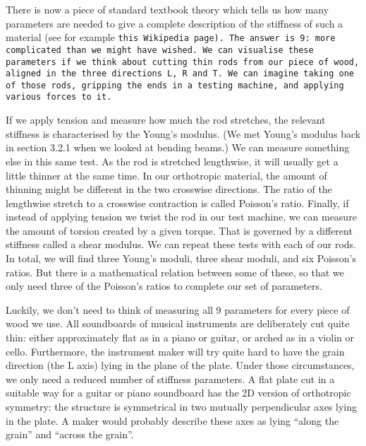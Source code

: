
  There is now a piece of standard textbook theory which tells us how many 
  parameters are needed to give a complete description of the stiffness of such 
  a material (see for example \tt{}this Wikipedia page\rm{}). The answer is 9: more 
  complicated than we might have wished. We can visualise these parameters if 
  we think about cutting thin rods from our piece of wood, aligned in the three 
  directions L, R and T. We can imagine taking one of those rods, gripping the 
  ends in a testing machine, and applying various forces to it. 

  If we apply tension and measure how much the rod stretches, the relevant 
  stiffness is characterised by the Young’s modulus. (We met Young’s modulus 
  back in section 3.2.1 when we looked at bending beams.) We can measure 
  something else in this same test. As the rod is stretched lengthwise, it will 
  usually get a little thinner at the same time. In our orthotropic material, 
  the amount of thinning might be different in the two crosswise directions. 
  The ratio of the lengthwise stretch to a crosswise contraction is called 
  Poisson’s ratio. Finally, if instead of applying tension we twist the rod in 
  our test machine, we can measure the amount of torsion created by a given 
  torque. That is governed by a different stiffness called a shear modulus. We 
  can repeat these tests with each of our rods. In total, we will find three 
  Young's moduli, three shear moduli, and six Poisson's ratios. But there is a 
  mathematical relation between some of these, so that we only need three of 
  the Poisson's ratios to complete our set of parameters. 

  Luckily, we don’t need to think of measuring all 9 parameters for every piece 
  of wood we use. All soundboards of musical instruments are deliberately cut 
  quite thin: either approximately flat as in a piano or guitar, or arched as 
  in a violin or cello. Furthermore, the instrument maker will try quite hard 
  to have the grain direction (the L axis) lying in the plane of the plate. 
  Under those circumstances, we only need a reduced number of stiffness 
  parameters. A flat plate cut in a suitable way for a guitar or piano 
  soundboard has the 2D version of orthotropic symmetry: the structure is 
  symmetrical in two mutually perpendicular axes lying in the plate. A maker 
  would probably describe these axes as lying “along the grain” and “across the 
  grain”. 

